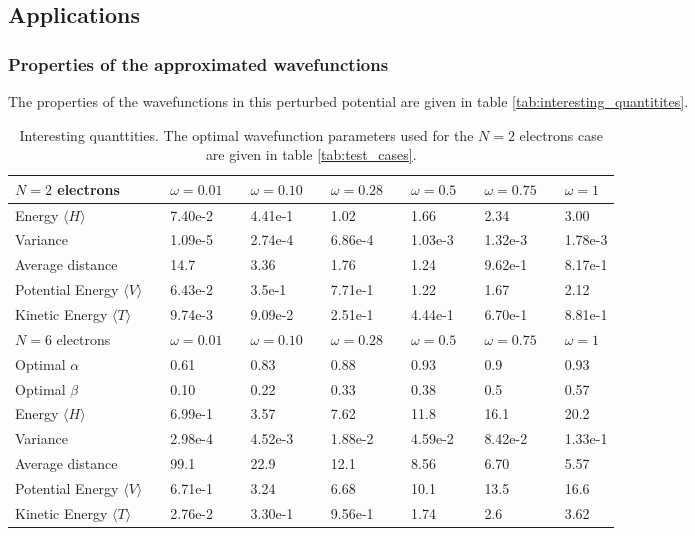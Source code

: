 \subsection{Applications}

\subsubsection{Properties of the approximated wavefunctions} \label{sec:prop_of_app}

The properties of the wavefunctions in this perturbed potential are given in table \ref{tab:interesting_quantitites}. 

\begin{table}[h!]
	\centering 
	\begin{tabular}{l@{ } l@{ } l@{ } l@{ } l@{ } l@{ } l}
		\toprule
		$N=2$ electrons & $\omega = 0.01 \quad $ &  $\omega = 0.10 \quad $ & $\omega =0.28 \quad $  & $\omega = 0.5 \quad $ & $\omega = 0.75 \quad $ & $\omega = 1$ \\
		\midrule
		Energy $\langle H \rangle$  & 	7.40e-2 & 4.41e-1 & 1.02  & 1.66 & 2.34 & 3.00\\
		\shaderow Variance  &	1.09e-5 & 2.74e-4 & 6.86e-4 & 1.03e-3  & 1.32e-3 & 1.78e-3 \\
		Average distance & 	14.7 & 3.36 & 1.76 & 1.24 & 9.62e-1 & 8.17e-1 \\
		\shaderow Potential Energy $\langle V \rangle  \quad $ & 6.43e-2 & 3.5e-1 & 7.71e-1 & 1.22 & 1.67 & 2.12 \\ 
		Kinetic Energy $\langle T \rangle$ &  9.74e-3 & 9.09e-2 & 2.51e-1  & 4.44e-1 & 6.70e-1 & 8.81e-1 \\
		\bottomrule
		\toprule
		$N=6$ electrons & $\omega = 0.01$ &  $\omega = 0.10$ & $\omega =0.28$ & $\omega = 0.5$ & $\omega = 0.75$ & $\omega = 1$ \\
		\midrule
		Optimal $\alpha$ & 0.61 & 0.83 & 0.88 & 0.93 & 0.9 & 0.93 \\
		\shaderow Optimal $\beta$  & 0.10 & 0.22 & 0.33 & 0.38 & 0.5 & 0.57 \\
		Energy $\langle H \rangle$  & 6.99e-1 & 3.57 & 7.62 &  11.8 & 16.1 & 20.2 \\
		\shaderow Variance  & 2.98e-4 & 4.52e-3 & 1.88e-2  & 4.59e-2 & 8.42e-2 & 1.33e-1 \\
		Average distance & 99.1 &	22.9 & 12.1 & 8.56 & 6.70 & 5.57 \\
		\shaderow Potential Energy $\langle V \rangle $ & 6.71e-1 &  3.24 & 6.68 & 10.1 & 13.5 & 16.6 \\ 
		Kinetic Energy $\langle T \rangle$ & 2.76e-2 &  3.30e-1 & 9.56e-1 & 1.74 & 2.6 & 3.62 \\
		\bottomrule
	\end{tabular}
	\caption{Interesting quanttities. 
			The optimal wavefunction parameters used for the $N=2$ electrons case are given in table \ref{tab:test_cases}.}
	\label{tab:interesting_quantitities}
\end{table}

